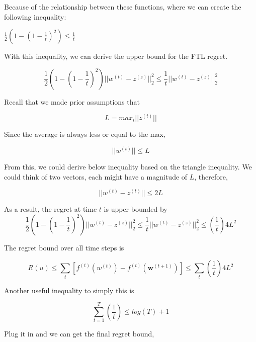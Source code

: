 \documentclass[11pt]{article}
\begin{document}
Because of the relationship between these functions, where we can create the following inequality:
\begin{center}
$\frac{1}{2}(1-(1-\frac{1}{t})^2) \leq \frac{1}{t}$
\end{center}

With this inequality, we can derive the upper bound for the FTL regret.

\begin{equation*}
    \frac{1}{2}(1-(1-\frac{1}{t})^2)||w^{(t)} - z^{(z)}||_2^2 \leq \frac{1}{t}||w^{(t)} - z^{(z)}||_2^2
\end{equation*}

Recall that we made prior assumptions that

\begin{equation*}
    L = max_t ||z^{(t)}||
\end{equation*}

Since the average is always less or equal to the max,

\begin{equation*}
    ||w^{(t)}|| \leq L
\end{equation*}

From this, we could derive below inequality based on the triangle inequality. We could think of two vectors, each might have a magnitude of $L$, therefore, 

\begin{equation*}
   ||w^{(t)} - z^{(t)}|| \leq 2L
\end{equation*}

As a result, the regret at time $t$ is upper bounded by
\begin{equation*}
    \frac{1}{2}(1-(1-\frac{1}{t})^2)||w^{(t)} - z^{(z)}||_2^2 \leq \frac{1}{t}||w^{(t)} - z^{(z)}||_2^2 \leq (\frac{1}{t}) 4L^2
\end{equation*}

The regret bound over all time steps is

\begin{equation*}
    R(u) \leq \sum_t [f^{(t)} (w^{(t)}) - f^{(t)}(\bm{w}^{(t+1)})] \leq \sum_t (\frac{1}{t}) 4L^2
\end{equation*}


Another useful inequality to simply this is

\begin{equation*}
     \sum_{t=1}^T (\frac{1}{t}) \leq log(T) + 1
\end{equation*}

Plug it in and we can get the final regret bound,
\end{document}
